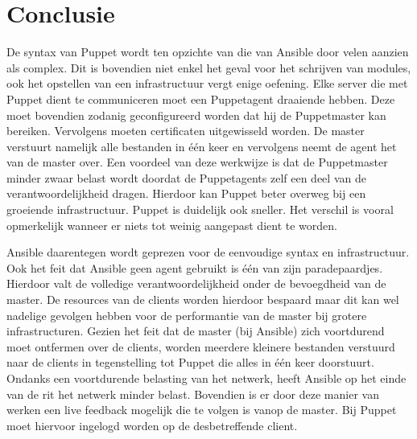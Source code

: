 
\chapter{Conclusie}
\label{ch:conclusie}

 De syntax van Puppet  wordt ten opzichte van die van Ansible door velen aanzien als complex. Dit is bovendien niet enkel het geval voor het schrijven van modules, ook het opstellen van een infrastructuur vergt enige oefening. Elke server die met Puppet dient te communiceren moet een Puppetagent draaiende hebben. Deze moet bovendien zodanig geconfigureerd worden dat hij de Puppetmaster kan bereiken. Vervolgens moeten certificaten uitgewisseld worden. De master verstuurt namelijk alle bestanden in \'e\'en keer en vervolgens neemt de agent het van de master over. Een voordeel van deze werkwijze is dat de Puppetmaster minder zwaar belast wordt doordat de Puppetagents zelf een deel van de verantwoordelijkheid dragen. Hierdoor kan Puppet beter overweg bij een groeiende infrastructuur. Puppet is duidelijk ook sneller. Het verschil is vooral opmerkelijk wanneer er niets tot weinig aangepast dient te worden. 

Ansible daarentegen wordt geprezen voor de eenvoudige syntax en infrastructuur. Ook het feit dat Ansible geen agent gebruikt is \'e\'en van zijn paradepaardjes. Hierdoor valt de volledige verantwoordelijkheid onder de bevoegdheid van de master. De resources van de clients worden hierdoor bespaard maar dit kan wel nadelige gevolgen hebben voor de performantie van de master bij grotere infrastructuren. Gezien het feit dat de master (bij Ansible) zich voortdurend moet ontfermen over de clients, worden meerdere kleinere bestanden verstuurd naar de clients in tegenstelling tot Puppet die alles in \'e\'en keer doorstuurt. Ondanks een voortdurende belasting van het netwerk, heeft Ansible op het einde van de rit het netwerk minder belast. Bovendien is er door deze manier van werken een live feedback mogelijk die te volgen is vanop de master. Bij Puppet moet hiervoor ingelogd worden op de desbetreffende client.




